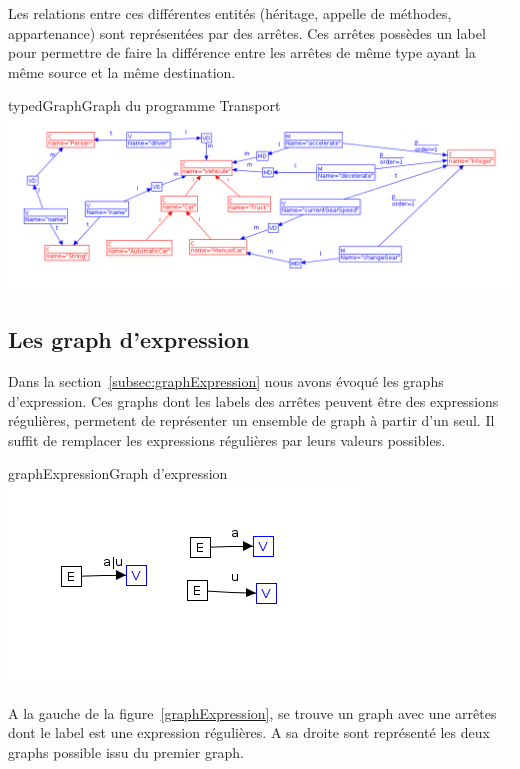 \documentclass[a4paper, 12pt]{article}
\begin{document}
Les relations entre ces différentes entités (héritage, appelle de méthodes, appartenance) sont représentées par des arrêtes. 
Ces arrêtes possèdes un label pour permettre de faire la différence entre les arrêtes de même type ayant la même source et la même destination.

\begin{myfig}{typedGraph}{Graph du programme Transport}
\includegraphics[width=\textwidth]{typedGraph.png}
\end{myfig}

\subsection{Les graph d'expression} 

Dans la section~\ref{subsec:graphExpression} nous avons évoqué les graphs d'expression. Ces graphs dont les labels des arrêtes peuvent être des expressions régulières, permetent de représenter un ensemble de graph à partir d'un seul. Il suffit de remplacer les expressions régulières par leurs valeurs possibles.

\begin{myfig}{graphExpression}{Graph d'expression}
\includegraphics{graphExpression.png}
\end{myfig}

A la gauche de la figure~\ref{graphExpression}, se trouve un graph avec une arrêtes dont le label est une expression régulières. A sa droite sont représenté les deux graphs possible issu du premier graph.
\end{document}
